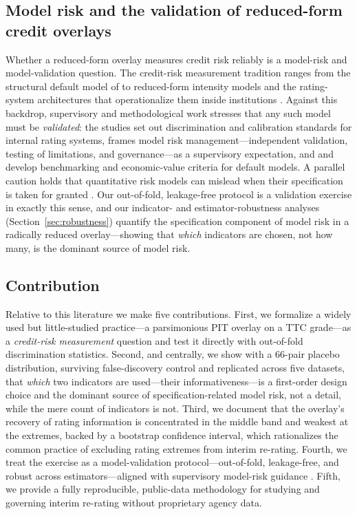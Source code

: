 \documentclass[pdflatex,sn-mathphys-ay]{sn-jnl}
\begin{document}
\subsection{Model risk and the validation of reduced-form credit overlays}
Whether a reduced-form overlay measures credit risk reliably is a model-risk and model-validation
question. The credit-risk measurement tradition ranges from the structural default model of
\citet{merton1974} to reduced-form intensity models \citep{jarrowturnbull1995,duffiesingleton1999} and
the rating-system architectures that operationalize them inside institutions \citep{crouhy2001prototype}.
Against this backdrop, supervisory and methodological work stresses that any such model must be
\emph{validated}: the \citet{bcbs2005validation} studies set out discrimination and calibration
standards for internal rating systems, \citet{sr2011modelrisk} frames model risk management---independent
validation, testing of limitations, and governance---as a supervisory expectation, and
\citet{sobehart2000benchmarking} and \citet{blochlinger2006} develop benchmarking and economic-value
criteria for default models. A parallel caution holds that quantitative risk models can mislead when
their specification is taken for granted \citep{danielsson2002,derman1996modelrisk}. Our out-of-fold,
leakage-free protocol is a validation exercise in exactly this sense, and our indicator- and
estimator-robustness analyses (Section~\ref{sec:robustness}) quantify the specification component of model
risk in a radically reduced overlay---showing that \emph{which} indicators are chosen, not how many, is
the dominant source of model risk.

\subsection{Contribution}
Relative to this literature we make five contributions. First, we formalize a widely used but
little-studied practice---a parsimonious PIT overlay on a TTC grade---as a \emph{credit-risk measurement}
question and test it directly with out-of-fold discrimination statistics. Second, and centrally, we show
with a 66-pair placebo distribution, surviving false-discovery control and replicated across five
datasets, that \emph{which} two indicators are used---their informativeness---is a first-order design
choice and the dominant source of specification-related model risk, not a detail, while the mere count
of indicators is not. Third, we document that the overlay's recovery of rating information is
concentrated in the middle band and weakest at the extremes, backed by a bootstrap confidence interval,
which rationalizes the common practice of excluding rating extremes from interim re-rating. Fourth, we treat the exercise as a model-validation protocol---out-of-fold, leakage-free, and
robust across estimators---aligned with supervisory model-risk guidance \citep{bcbs2005validation,sr2011modelrisk}.
Fifth, we provide a fully reproducible, public-data methodology for studying and governing interim
re-rating without proprietary agency data.
\end{document}
